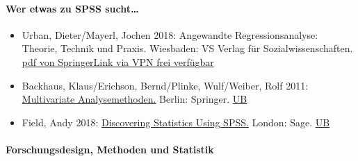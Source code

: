 \documentclass[
]{article}
\begin{document}
\hypertarget{wer-etwas-zu-spss-sucht}{%
\paragraph{Wer etwas zu SPSS
sucht\ldots{}}\label{wer-etwas-zu-spss-sucht}}

\begin{itemize}
\item
  Urban, Dieter/Mayerl, Jochen 2018: Angewandte Regressionsanalyse:
  Theorie, Technik und Praxis. Wiesbaden: VS Verlag für
  Sozialwissenschaften.
  \href{https://link.springer.com/content/pdf/10.1007\%2F978-3-658-01915-0.pdf}{pdf
  von SpringerLink via VPN frei verfügbar}
\item
  Backhaus, Klaus/Erichson, Bernd/Plinke, Wulf/Weiber, Rolf 2011:
  \href{https://www.springer.com/de/book/9783662566541}{Multivariate
  Analysemethoden.} Berlin: Springer.
  \href{https://stg.ibs-bw.de/aDISWeb/app?service=direct/0/Home/$DirectLink\&sp=SOPAC02\&sp=SAKSWB-IdNr1026759854}{UB}
\item
  Field, Andy 2018:
  \href{https://www.discoveringstatistics.com/books/dsus/}{Discovering
  Statistics Using SPSS.} London: Sage.
  \href{https://stg.ibs-bw.de/aDISWeb/app?service=direct/0/Home/$DirectLink\&sp=SOPAC02\&sp=SAKSWB-IdNr887803784}{UB}
\end{itemize}

\hypertarget{forschungsdesign-methoden-und-statistik}{%
\paragraph{Forschungsdesign, Methoden und
Statistik}\label{forschungsdesign-methoden-und-statistik}}
\end{document}
